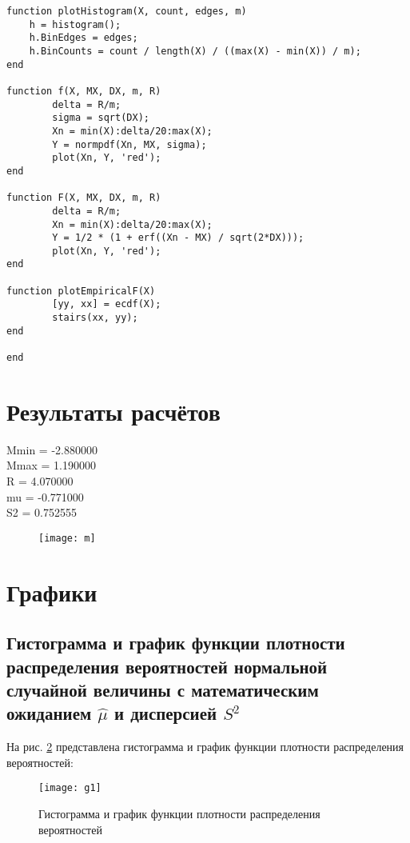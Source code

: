 \documentclass[a4paper, 12pt]{article}
\theoremstyle{definition}
\begin{document}
\begin{lstlisting}
function plotHistogram(X, count, edges, m)
    h = histogram();
    h.BinEdges = edges;
    h.BinCounts = count / length(X) / ((max(X) - min(X)) / m);
end

function f(X, MX, DX, m, R)
        delta = R/m;
        sigma = sqrt(DX);
        Xn = min(X):delta/20:max(X);
        Y = normpdf(Xn, MX, sigma);
        plot(Xn, Y, 'red');
end

function F(X, MX, DX, m, R)
        delta = R/m;
        Xn = min(X):delta/20:max(X);
        Y = 1/2 * (1 + erf((Xn - MX) / sqrt(2*DX))); 
        plot(Xn, Y, 'red');
end

function plotEmpiricalF(X)  
        [yy, xx] = ecdf(X);
        stairs(xx, yy);
end

end
\end{lstlisting}

\section{Результаты расчётов}


Mmin = -2.880000 \\
Mmax = 1.190000 \\
R = 4.070000 \\
mu = -0.771000 \\
S2 = 0.752555 \\


\begin{figure}[H]
        		\texttt{[image: m]}
        		\label{fig:g1}
        \end{figure}


\section{Графики}

\subsection{Гистограмма и график функции плотности распределения вероятностей нормальной случайной величины с математическим ожиданием $\hat{\mu}$ и дисперсией $S^2$}

На рис. \ref{fig:g1} представлена гистограмма и график функции плотности распределения вероятностей:
	
	\begin{figure}[H]
        	\begin{center}
        		\texttt{[image: g1]}
        		\caption{Гистограмма и график функции плотности распределения вероятностей}
        		\label{fig:g1}
        	\end{center}
        \end{figure}
\end{document}
